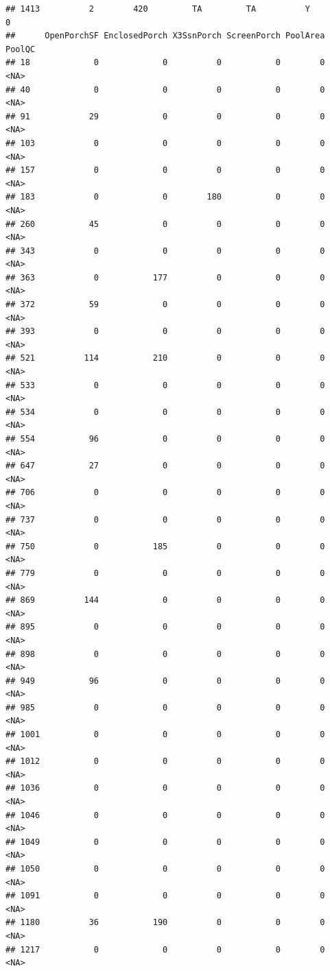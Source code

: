 \documentclass[]{article}
\begin{document}
\begin{verbatim}
## 1413          2        420         TA         TA          Y          0
##      OpenPorchSF EnclosedPorch X3SsnPorch ScreenPorch PoolArea PoolQC
## 18             0             0          0           0        0   <NA>
## 40             0             0          0           0        0   <NA>
## 91            29             0          0           0        0   <NA>
## 103            0             0          0           0        0   <NA>
## 157            0             0          0           0        0   <NA>
## 183            0             0        180           0        0   <NA>
## 260           45             0          0           0        0   <NA>
## 343            0             0          0           0        0   <NA>
## 363            0           177          0           0        0   <NA>
## 372           59             0          0           0        0   <NA>
## 393            0             0          0           0        0   <NA>
## 521          114           210          0           0        0   <NA>
## 533            0             0          0           0        0   <NA>
## 534            0             0          0           0        0   <NA>
## 554           96             0          0           0        0   <NA>
## 647           27             0          0           0        0   <NA>
## 706            0             0          0           0        0   <NA>
## 737            0             0          0           0        0   <NA>
## 750            0           185          0           0        0   <NA>
## 779            0             0          0           0        0   <NA>
## 869          144             0          0           0        0   <NA>
## 895            0             0          0           0        0   <NA>
## 898            0             0          0           0        0   <NA>
## 949           96             0          0           0        0   <NA>
## 985            0             0          0           0        0   <NA>
## 1001           0             0          0           0        0   <NA>
## 1012           0             0          0           0        0   <NA>
## 1036           0             0          0           0        0   <NA>
## 1046           0             0          0           0        0   <NA>
## 1049           0             0          0           0        0   <NA>
## 1050           0             0          0           0        0   <NA>
## 1091           0             0          0           0        0   <NA>
## 1180          36           190          0           0        0   <NA>
## 1217           0             0          0           0        0   <NA>

\end{verbatim}
\end{document}
